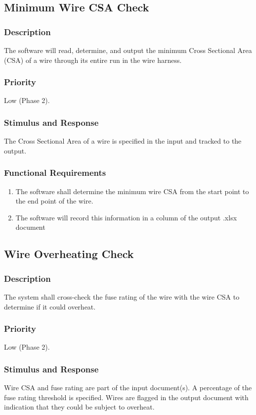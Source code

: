   \subsection{Minimum Wire CSA Check}
\subsubsection{Description}
 The software will read, determine, and output the minimum Cross Sectional Area (CSA) of a wire through its entire run in the wire harness.
\subsubsection{Priority}
Low (Phase 2).

\subsubsection{Stimulus and Response}
The Cross Sectional Area of a wire is specified in the input and tracked to the output.

\subsubsection{Functional Requirements}
\begin{enumerate}
 \item The software shall determine the minimum wire CSA from the start point to the end point of the wire.
 \item The software will record this information in a column of the output .xlsx document
\end{enumerate}


  \subsection{Wire Overheating Check}
\subsubsection{Description}
The system shall cross-check the fuse rating of the wire with the wire CSA to determine if it could overheat.

\subsubsection{Priority}
Low (Phase 2).

\subsubsection{Stimulus and Response}
Wire CSA and fuse rating are part of the input document(s). A percentage of the fuse rating threshold is specified. Wires are flagged in the output document with indication that they could be subject to overheat.

